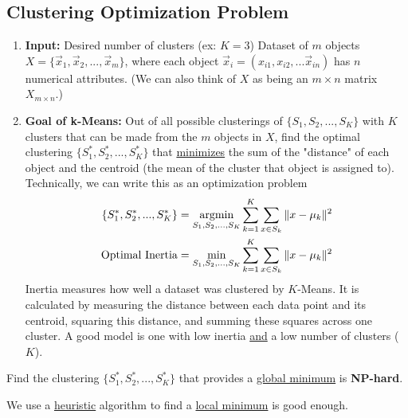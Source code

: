 \documentclass[11pt]{elegantbook}
\newcommand{\argmin}{\operatornamewithlimits{argmin}}
\begin{document}
\subsection{Clustering Optimization Problem}
\begin{enumerate}
    \item \textbf{Input:}
    \subitem Desired number of clusters (ex: $K=3$)
    \subitem Dataset of $m$ objects $X=\{\vec{x}_1,\vec{x}_2,...,\vec{x}_m\}$, where each object $\vec{x}_i=(x_{i1},x_{i2},...\vec{x}_{in})$ has $n$ numerical attributes. (We can also think of $X$ as being an $m\times n$ matrix $X_{m\times n}$.)
    \item \textbf{Goal of k-Means:}
    \subitem Out of all possible clusterings of $\{S_1 ,S_2 , ... , S_K\}$ with $K$ clusters that can be made from the $m$ objects in $X$, find the optimal clustering $\{S_1^*,S_2^*,...,S_K^*\}$ that \underline{minimizes} the sum of the "distance" of each object and the centroid (the mean of the cluster that object is assigned to).
    \subitem Technically, we can write this as an optimization problem
    \begin{equation}
        \begin{aligned}
            \{S_1^*,S_2^*,...,S_K^*\}=\argmin_{S_1,S_2,...,S_K}\sum_{k=1}^K\sum_{x\in S_k}\|x-\mu_k\|^2\\
            \textnormal{Optimal Inertia}=\min_{S_1,S_2,...,S_K}\sum_{k=1}^K\sum_{x\in S_k}\|x-\mu_k\|^2\\
        \end{aligned}
        \nonumber
    \end{equation}
    Inertia measures how well a dataset was clustered by $K$-Means. It is calculated by measuring the distance between each data point and its centroid, squaring this distance, and summing these squares across one cluster. A good model is one with low inertia \underline{and} a low number of clusters ($K$).
\end{enumerate}
Find the clustering $\{S_1^*,S_2^*,...,S_K^*\}$ that provides a \underline{global minimum} is \textbf{NP-hard}.

We use a \underline{heuristic} algorithm to find a \underline{local minimum} is good enough.
\end{document}
